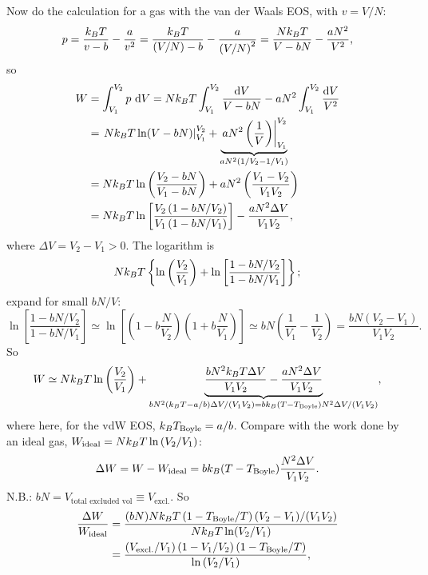 Now do the calculation for a gas with the van der Waals EOS, with $v = V/N$:
\begin{equation}
  p = \frac{k_{B} T}{v-b} - \frac{a}{v^2} = \frac{k_{B} T}{\left(V/N\right)-b} - \frac{a}{\left(V/N\right)^2} = \frac{Nk_{B} T}{V-bN} - \frac{aN^2}{V^2},
\end{equation}
so
\begin{align}
  W &= \int_{V_1}^{V_2}p\,\mathop{}\!\mathrm{d} V = Nk_{B} T\int_{V_1}^{V_2}\frac{\mathop{}\!\mathrm{d} V}{V-bN} - aN^2\int_{V_1}^{V_2}\frac{\mathop{}\!\mathrm{d} V}{V^2}\nonumber\\
    &= \left.Nk_{B} T\ln(V-bN)\right|_{V_1}^{V_2} + \underbrace{\left.aN^2\left(\frac{1}{V}\right)\right|_{V_1}^{V_2}}_{aN^2\left(1/V_2-1/V_1\right)}\nonumber\\
    &= Nk_{B} T\ln\left(\frac{V_2-bN}{V_1-bN}\right) + aN^2\left(\frac{V_1-V_2}{V_1V_2}\right)\nonumber\\
  &= Nk_{B} T\ln\left[\frac{V_2\left(1-bN/V_2\right)}{V_1\left(1-bN/V_1\right)}\right] - \frac{aN^2\Delta V}{V_1V_2},
\end{align}
where $\Delta V = V_2-V_1>0$. The logarithm is
\begin{equation}
  Nk_{B} T\left\{\ln\left(\frac{V_2}{V_1}\right) + \ln\left[\frac{1-bN/V_2}{1-bN/V_1}\right]\right\};
\end{equation}
expand for small $bN/V$:
\begin{equation}
  \ln\left[\frac{1-bN/V_2}{1-bN/V_1}\right]\simeq\ln\left[\left(1-b\frac{N}{V_2}\right)\left(1+b\frac{N}{V_1}\right)\right]
  \simeq bN\left(\frac{1}{V_1}-\frac{1}{V_2}\right) = \frac{bN(V_2-V_1)}{V_1V_2}.
\end{equation}
So
\begin{equation}
  W\simeq Nk_{B} T\ln\left(\frac{V_2}{V_1}\right) + \underbrace{\frac{bN^2k_{B} T\Delta V}{V_1V_2} - \frac{aN^2\Delta V}{V_1V_2}}_{bN^2\left(k_{B} T-a/b\right)\Delta V/(V_1V_2) = bk_{B}(T-T_{\text{Boyle}})N^2\Delta V/(V_1V_2)},
\end{equation}
where here, for the vdW EOS, $k_{B} T_{\text{Boyle}} = a/b$. Compare with the work done by an ideal gas,
$W_{\text{ideal}} = Nk_{B} T\ln\left(V_2/V_1\right)$:
\begin{equation}
  \Delta W = W - W_{\text{ideal}} = bk_{B}(T-T_{\text{Boyle}})\frac{N^2\Delta V}{V_1V_2}.
\end{equation}
N.B.: $bN = V_{\text{total excluded vol}}\equiv V_{\text{excl.}}$. So
\begin{align}
  \frac{\Delta W}{W_{\text{ideal}}} &= \frac{(bN)Nk_{B} T\left(1-T_{\text{Boyle}}/T\right)(V_2-V_1)/(V_1V_2)}{Nk_{B} T\ln(V_2/V_1)}\nonumber\\
  &= \frac{\left(V_{\text{excl.}}/V_1\right)\left(1-V_1/V_2\right)\left(1-T_{\text{Boyle}}/T\right)}{\ln\left(V_2/V_1\right)},
\end{align}
